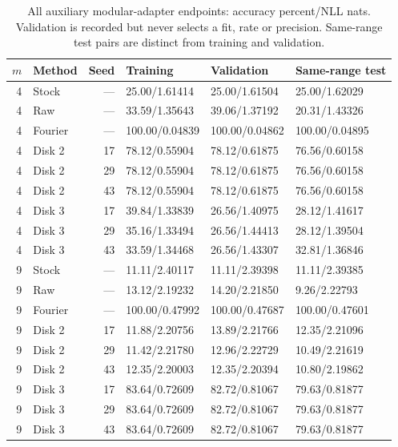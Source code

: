 \begin{table}[htbp]
\centering\small
\caption{All auxiliary modular-adapter endpoints: accuracy percent/NLL nats.
Validation is recorded but never selects a fit, rate or precision. Same-range
test pairs are distinct from training and validation.}
\label{tab:modular-auxiliary}
\begin{tabular}{rlrlll}
\toprule
$m$ & Method & Seed & Training & Validation & Same-range test\\
\midrule
4 & Stock & --- & 25.00/1.61414 & 25.00/1.61504 & 25.00/1.62029\\
4 & Raw & --- & 33.59/1.35643 & 39.06/1.37192 & 20.31/1.43326\\
4 & Fourier & --- & 100.00/0.04839 & 100.00/0.04862 & 100.00/0.04895\\
4 & Disk 2 & 17 & 78.12/0.55904 & 78.12/0.61875 & 76.56/0.60158\\
4 & Disk 2 & 29 & 78.12/0.55904 & 78.12/0.61875 & 76.56/0.60158\\
4 & Disk 2 & 43 & 78.12/0.55904 & 78.12/0.61875 & 76.56/0.60158\\
4 & Disk 3 & 17 & 39.84/1.33839 & 26.56/1.40975 & 28.12/1.41617\\
4 & Disk 3 & 29 & 35.16/1.33494 & 26.56/1.44413 & 28.12/1.39504\\
4 & Disk 3 & 43 & 33.59/1.34468 & 26.56/1.43307 & 32.81/1.36846\\
9 & Stock & --- & 11.11/2.40117 & 11.11/2.39398 & 11.11/2.39385\\
9 & Raw & --- & 13.12/2.19232 & 14.20/2.21850 & 9.26/2.22793\\
9 & Fourier & --- & 100.00/0.47992 & 100.00/0.47687 & 100.00/0.47601\\
9 & Disk 2 & 17 & 11.88/2.20756 & 13.89/2.21766 & 12.35/2.21096\\
9 & Disk 2 & 29 & 11.42/2.21780 & 12.96/2.22729 & 10.49/2.21619\\
9 & Disk 2 & 43 & 12.35/2.20003 & 12.35/2.20394 & 10.80/2.19862\\
9 & Disk 3 & 17 & 83.64/0.72609 & 82.72/0.81067 & 79.63/0.81877\\
9 & Disk 3 & 29 & 83.64/0.72609 & 82.72/0.81067 & 79.63/0.81877\\
9 & Disk 3 & 43 & 83.64/0.72609 & 82.72/0.81067 & 79.63/0.81877\\
\bottomrule
\end{tabular}
\end{table}

